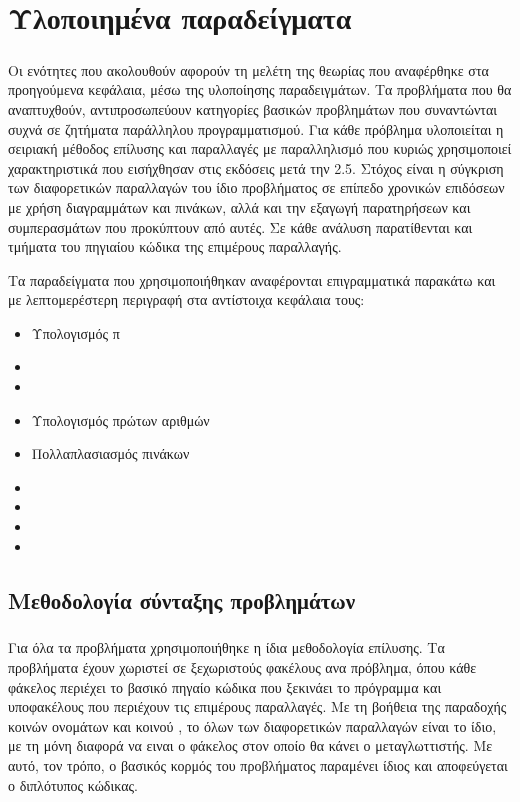 \section{Υλοποιημένα παραδείγματα\cite{dummy}}
\subparagraph{}
Οι ενότητες που ακολουθούν αφορούν τη μελέτη της θεωρίας που αναφέρθηκε στα προηγούμενα κεφάλαια, μέσω της υλοποίησης
παραδειγμάτων. Τα προβλήματα που θα αναπτυχθούν, αντιπροσωπεύουν κατηγορίες βασικών προβλημάτων που συναντώνται συχνά σε
ζητήματα παράλληλου προγραμματισμού. Για κάθε πρόβλημα υλοποιείται η σειριακή μέθοδος επίλυσης και παραλλαγές με
παραλληλισμό που κυριώς χρησιμοποιεί χαρακτηριστικά που εισήχθησαν στις εκδόσεις μετά την 2.5. Στόχος είναι η σύγκριση
των διαφορετικών παραλλαγών του ίδιο προβλήματος σε επίπεδο χρονικών επιδόσεων με χρήση διαγραμμάτων και πινάκων, αλλά
και την εξαγωγή παρατηρήσεων και συμπερασμάτων που προκύπτουν από αυτές. Σε κάθε ανάλυση παρατίθενται και τμήματα του
πηγιαίου κώδικα της επιμέρους παραλλαγής.

Τα παραδείγματα που χρησιμοποιήθηκαν αναφέρονται επιγραμματικά παρακάτω και με λεπτομερέστερη περιγραφή στα αντίστοιχα
κεφάλαια τους:
\begin{itemize}
    \item Υπολογισμός π
    \item {}
    \item {}
    \item Υπολογισμός πρώτων αριθμών
    \item Πολλαπλασιασμός πινάκων
    \item {}
    \item {}
    \item {}
    \item {}
\end{itemize}

\clearpage
\subsection{Μεθοδολογία σύνταξης προβλημάτων}
\subparagraph{}
Για όλα τα προβλήματα χρησιμοποιήθηκε η ίδια μεθοδολογία επίλυσης. Τα προβλήματα έχουν χωριστεί σε ξεχωριστούς φακέλους
ανα πρόβλημα, όπου κάθε φάκελος περιέχει το βασικό πηγαίο κώδικα που ξεκινάει το πρόγραμμα και υποφακέλους που περιέχουν
τις επιμέρους παραλλαγές. Με τη βοήθεια της παραδοχής κοινών ονομάτων και κοινού , το  όλων
των διαφορετικών παραλλαγών είναι το ίδιο, με τη μόνη διαφορά να ειναι ο φάκελος στον οποίο θα κάνει  ο
μεταγλωττιστής. Με αυτό, τον τρόπο, ο βασικός κορμός του προβλήματος παραμένει ίδιος και αποφεύγεται ο διπλότυπος
κώδικας.

